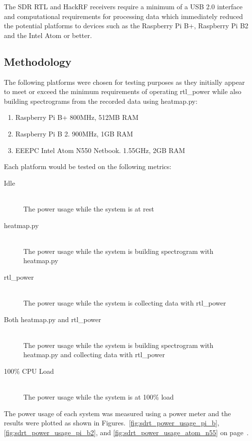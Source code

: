 The SDR RTL and HackRF receivers require a minimum of a USB 2.0 interface and computational requirements for processing data which immediately reduced the potential platforms to devices such as the Raspberry Pi B+, Raspberry Pi B2 and the Intel Atom or better.

\subsection*{Methodology}
The following platforms were chosen for testing purposes as they initially appear to meet or exceed the minimum requirements of operating rtl\_power while also building spectrograms from the recorded data using heatmap.py:

\begin{enumerate}
	\item Raspberry Pi B+ 800MHz, 512MB RAM
	\item Raspberry Pi B 2. 900MHz, 1GB RAM
	\item EEEPC Intel Atom N550 Netbook. 1.55GHz, 2GB RAM
\end{enumerate}

Each platform would be tested on the following metrics:

\begin{description}
	\item [Idle] \hfil \\
	The power usage while the system is at rest
	\item [heatmap.py] \hfill \\ 
	The power usage while the system is building spectrogram with heatmap.py
	\item [rtl\_power] \hfill \\
	The power usage while the system is collecting data with rtl\_power
	\item [Both heatmap.py and rtl\_power] \hfill \\
	The power usage while the system is building spectrogram with heatmap.py and collecting data with rtl\_power
	\item [100\% CPU Load] \hfill \\
	The power usage while the system is at 100\% load
\end{description}


The power usage of each system was measured using a power meter and the results were plotted as shown in Figures.~\ref{fig:sdrt_power_usage_pi_b}, \ref{fig:sdrt_power_usage_pi_b2}, and \ref{fig:sdrt_power_usage_atom_n55} on page~\pageref{fig:sdrt_power_usage_pi_b}.


